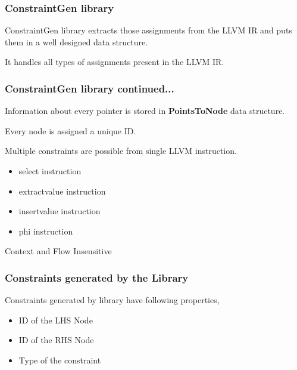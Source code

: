 \documentclass{beamer}
\begin{document}
\begin{frame}
\frametitle{ConstraintGen library}
ConstraintGen library extracts those assignments from the LLVM IR and puts
them in a well designed data structure.

\vspace{15pt}
\pause
It handles all types of assignments present in the LLVM IR.

\end{frame}

\begin{frame}
\frametitle{ConstraintGen library continued...}

Information about every pointer is stored in \textbf{PointsToNode} data structure.

\vspace{15pt}
\pause
Every node is assigned a unique ID. %

\vspace{15pt}
\pause
Multiple constraints are possible from single LLVM instruction.
\begin{itemize}
    \item select instruction
    \item extractvalue instruction
    \item insertvalue instruction
    \item phi instruction
\end{itemize}

\vspace{15pt}
\pause
Context and Flow Insensitive

\end{frame}

\begin{frame}
\frametitle{Constraints generated by the Library}
Constraints generated by library have following properties,
\begin{itemize}
    \item<1-> ID of the LHS Node
    \item<2-> ID of the RHS Node
    \item<3-> Type of the constraint
\end{itemize}

\end{frame}
\end{document}
